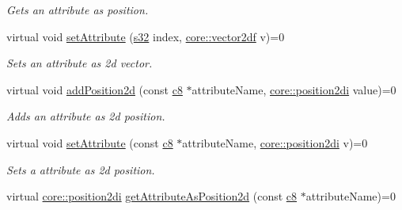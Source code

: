 \begin{DoxyCompactItemize}
\begin{DoxyCompactList}\small\item\em Gets an attribute as position. \end{DoxyCompactList}\item 
\mbox{\label{classirr_1_1io_1_1IAttributes_a10fd4234098fbdbc53c1a2e32fb370f2}} 
virtual void \hyperlink{classirr_1_1io_1_1IAttributes_a10fd4234098fbdbc53c1a2e32fb370f2}{set\+Attribute} (\hyperlink{namespaceirr_ac66849b7a6ed16e30ebede579f9b47c6}{s32} index, \hyperlink{namespaceirr_1_1core_a116f90bd31515724b6235014ee2b74d5}{core\+::vector2df} v)=0
\begin{DoxyCompactList}\small\item\em Sets an attribute as 2d vector. \end{DoxyCompactList}\item 
\mbox{\label{classirr_1_1io_1_1IAttributes_ae875ea8d21955b4945b3d2d4f6e739fe}} 
virtual void \hyperlink{classirr_1_1io_1_1IAttributes_ae875ea8d21955b4945b3d2d4f6e739fe}{add\+Position2d} (const \hyperlink{namespaceirr_a9395eaea339bcb546b319e9c96bf7410}{c8} $\ast$attribute\+Name, \hyperlink{namespaceirr_1_1core_ace0f1379db5f9f5660456ec57ab78202}{core\+::position2di} value)=0
\begin{DoxyCompactList}\small\item\em Adds an attribute as 2d position. \end{DoxyCompactList}\item 
\mbox{\label{classirr_1_1io_1_1IAttributes_abd4c30bfab5a3755682b9fc902b04310}} 
virtual void \hyperlink{classirr_1_1io_1_1IAttributes_abd4c30bfab5a3755682b9fc902b04310}{set\+Attribute} (const \hyperlink{namespaceirr_a9395eaea339bcb546b319e9c96bf7410}{c8} $\ast$attribute\+Name, \hyperlink{namespaceirr_1_1core_ace0f1379db5f9f5660456ec57ab78202}{core\+::position2di} v)=0
\begin{DoxyCompactList}\small\item\em Sets a attribute as 2d position. \end{DoxyCompactList}\item 
virtual \hyperlink{namespaceirr_1_1core_ace0f1379db5f9f5660456ec57ab78202}{core\+::position2di} \hyperlink{classirr_1_1io_1_1IAttributes_abedde01b678c482be20735e4d730942f}{get\+Attribute\+As\+Position2d} (const \hyperlink{namespaceirr_a9395eaea339bcb546b319e9c96bf7410}{c8} $\ast$attribute\+Name)=0

\end{DoxyCompactItemize}

